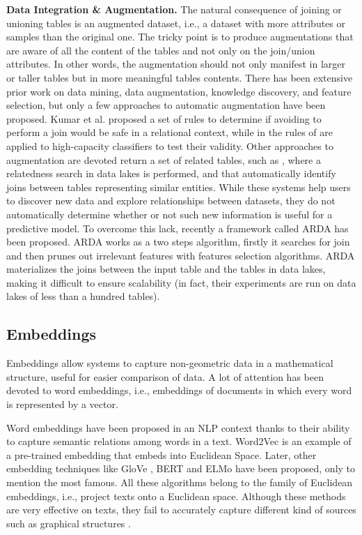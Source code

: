 \textbf{Data Integration \& Augmentation.} The natural consequence of joining or unioning tables is an augmented dataset, i.e., a dataset with more attributes or samples than the original one. The tricky point is to produce augmentations that are aware of all the content of the tables and not only on the join/union attributes. In other words, the augmentation should not only manifest in larger or taller tables but in more meaningful tables contents. There has been extensive prior work on data mining, data augmentation, knowledge discovery, and feature selection, but only a few approaches to automatic augmentation have been proposed. Kumar et al. \cite{kumar2016join} proposed a set of rules to determine if avoiding to perform a join would be safe in a relational context, while in \cite{shah2017key} the rules of \cite{kumar2016join} are applied to high-capacity classifiers to test their validity. Other approaches to augmentation are devoted return a set of related tables, such as \cite{bogatu2020dataset}, where a relatedness search in data lakes is performed, and \cite{fernandez2018aurum} that automatically identify joins between tables representing similar entities. While these systems help users to discover new data and explore relationships between datasets, they do not automatically determine whether or not such new information
is useful for a predictive model. To overcome this lack, recently a framework called ARDA \cite{chepurko2020arda} has been proposed. ARDA works as a two steps algorithm, firstly it searches for join and then prunes out irrelevant features with features selection algorithms. ARDA materializes the joins between the input table and the tables in data lakes, making it difficult to ensure scalability (in fact, their experiments are run on data lakes of less than a hundred tables).

\subsection{Embeddings}
Embeddings allow systems to capture non-geometric data in a mathematical structure, useful for easier comparison of data. A lot of attention has been devoted to word embeddings, i.e., embeddings of documents in which every word is represented by a vector. 

Word embeddings have been proposed in an NLP context thanks to their ability to capture semantic relations among words in a text. 
Word2Vec \cite{Mikolov2013EfficientEO} is an example of a pre-trained embedding that embeds into Euclidean Space. 
Later, other embedding techniques like GloVe \cite{pennington2014glove}, BERT \cite{devlin2018bert} and ELMo \cite{peters2018deep} have been proposed, only to mention the most famous. 
All these algorithms belong to the family of Euclidean embeddings, i.e., project texts onto a Euclidean space. 
Although these methods are very effective on texts, they fail to accurately capture different kind of sources such as graphical structures \cite{NIPS2017_7213}. 

